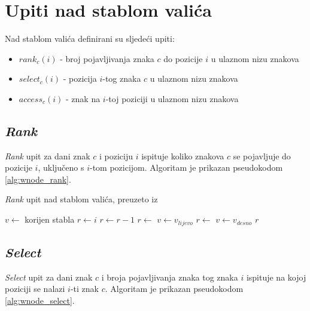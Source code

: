 \section{Upiti nad stablom valića}

Nad stablom valića definirani su sljedeći upiti:

\begin{itemize}
    \item $rank_c(i)$ - broj pojavljivanja znaka $c$ do pozicije $i$ u ulaznom nizu znakova
    \item $select_c(i)$ - pozicija $i$-tog znaka $c$ u ulaznom nizu znakova
    \item $access_c(i)$ - znak na $i$-toj poziciji u ulaznom nizu znakova
\end{itemize}

\subsection{\emph{Rank}}

\emph{Rank} upit za dani znak $c$ i poziciju $i$ ispituje koliko znakova $c$ se pojavljuje do pozicije $i$, uključeno s $i$-tom pozicijom. Algoritam je prikazan pseudokodom \ref{alg:wnode_rank}.

\begin{algorithm}[H]
  \caption{\emph{Rank} upit nad stablom valića, preuzeto iz \cite{breberic}}
  \begin{algorithmic}[1]
    \State $v \gets $ korijen stabla
    \State $r \gets i$
       \State $r \gets r - 1$ \EndIf
        \State $r \gets$ 
        \State $v \gets v_{lijevo}$
      \Else
        \State $r \gets$ 
        \State $v \gets v_{desno}$
      \EndIf
        \EndIf
    \EndWhile \State{}
    \Return $r$
    \EndFunction
  \end{algorithmic}
  \label{alg:wnode_rank}
\end{algorithm}

\subsection{\emph{Select}}

\emph{Select} upit za dani znak $c$ i broja pojavljivanja znaka tog znaka $i$ ispituje na kojoj poziciji se nalazi $i$-ti znak $c$. Algoritam je prikazan pseudokodom \ref{alg:wnode_select}.

